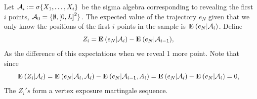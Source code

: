 Let $\mathcal{A}_i := \sigma\{X_1,\ldots,X_i\}$ be the sigma algebra corresponding to revealing the first $i$ points, $\mathcal{A}_0 = \{\emptyset, {[0,L]}^2\}$. The expected value of the trajectory $e_N$ given that we only know the positions of the first $i$ points in the sample is $\mathbf{E}\: (e_N | \mathcal{A}_i)$. Define
\[ Z_i = \mathbf{E}\: (e_N | \mathcal{A}_i) - \mathbf{E}\: (e_N | \mathcal{A}_{i-1}),  \]  
As the difference of this expectations when we reveal 1 more point. Note that since
\[ \mathbf{E}\:(Z_i | \mathcal{A}_i) =  \mathbf{E}\: (e_N | \mathcal{A}_i, \mathcal{A}_i) - \mathbf{E}\: (e_N | \mathcal{A}_{i-1}, A_i) = \mathbf{E}\: (e_N | \mathcal{A}_i) - \mathbf{E}\: (e_N | \mathcal{A}_i) = 0,\] 
The $Z_i's$ form a vertex exposure martingale sequence.

\begin{figure}[ht]\label{TSP:pic1}


\end{figure}
